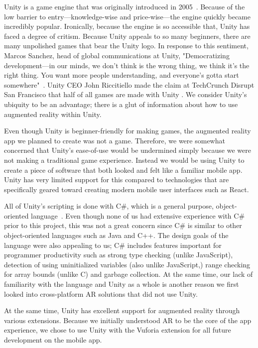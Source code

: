 \documentclass[a4paper, 10pt, american, titlepage]{article}
\begin{document}
Unity is a game engine that was originally introduced in
2005~\autocite{axon2016}. Because of the low barrier to entry---knowledge-wise
and price-wise---the engine quickly became incredibly popular. Ironically,
because the engine is so accessible that, Unity has faced a degree of critism.
Because Unity appeals to so many beginners, there are many unpolished games that
bear the Unity logo. In response to this sentiment, Marcos Sanchez, head of
global communications at Unity, "Democratizing development---in our minds, we
don't think is the wrong thing, we think it's the right thing. You want more
people understanding, and everyone’s gotta start somewhere"~\autocite{axon2016}.
Unity CEO John Riccitiello made the claim at TechCrunch Disrupt San Francisco
that half of all games are made with Unity \autocite{dillet2018}. We consider
Unity's ubiquity to be an advantage; there is a glut of information about how to
use augmented reality within Unity.

Even though Unity is beginner-friendly for making games, the augmented reality
app we planned to create was not a game. Therefore, we were somewhat concerned
that Unity's ease-of-use would be undermined simply because we were not making a
traditional game experience. Instead we would be using Unity to create a piece
of software that both looked and felt like a familiar mobile app. Unity has very
limited support for this compared to technologies that are specifically geared
toward creating modern mobile user interfaces such as React.

All of Unity's scripting is done with C\#, which is a general purpose,
object-oriented language~\autocite{ecmainternational2017}. Even though none of
us had extensive experience with C\# prior to this project, this was not a great
concern since C\# is similar to other object-oriented languages such as Java and
C++. The design goals of the language were also appealing to us; C\# includes
features important for programmer productivity such as strong type checking
(unlike JavaScript), detection of using uninitialized variables (also unlike
JavaScript,) range checking for array bounds (unlike C) and garbage collection.
At the same time, our lack of familiarity with the language and Unity as a whole
is another reason we first looked into cross-platform AR solutions that did not
use Unity.

At the same time, Unity has excellent support for augmented reality through
various extensions. Because we initially understood AR to be the core of the app
experience, we chose to use Unity with the Vuforia extension for all future
development on the mobile app.
\end{document}
